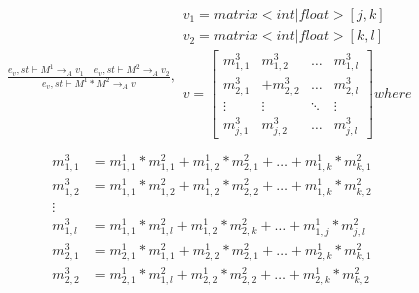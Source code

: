 \begin{minipage}{1.0\textwidth}
\begin{equation}
\begin{aligned}
	\frac { { e }_{ v },st\vdash { M }^{ 1 }{ \rightarrow  }_{ A }{ v }_{ 1 }\quad { e }_{ v },st\vdash { M }^{ 2 }{ \rightarrow  }_{ A }{ v }_{ 2 } }{ { e }_{ v },st\vdash { M }^{ 1 }*{ M }^{ 2 }{ \rightarrow  }_{ A }{ v } } ,\begin{matrix} { v }_{ 1 }=matrix<int|float>[j,k] \\ { v }_{ 2 }=matrix<int|float>[k,l] \\
	 v=\begin{bmatrix} { { m }_{ 1,1 }^{ 3 } } & { { m }_{ 1,2 }^{ 3 } } & \dots  & { m }_{ 1,l }^{ 3 }\\
{ { m }_{ 2,1 }^{ 3 } } &   +{ { m }_{ 2,2 }^{ 3 } } & \dots & { { m }_{ 2,l }^{ 3 } }
\\ \vdots  & \vdots & \ddots  & \vdots  \\
 { m }_{ j,1 }^{ 3 }& { { m }_{ j,2 }^{ 3 } } & \dots & { m }_{ j,l }^{ 3 } \end{bmatrix} where
\\ \end{matrix}
\end{aligned}
\end{equation}
\begin{equation*}
\begin{aligned}
{ { m }_{ 1,1 }^{ 3 } }  &= { { m }_{ 1,1 }^{ 1 } } *{ { m }_{ 1,1 }^{ 2 } }+ { { m }_{ 1,2 }^{ 1 } } *{ { m }_{ 2,1 }^{ 2 } }+\dots+ { { m }_{ 1,k }^{ 1 } } *{ { m }_{ k,1 }^{ 2 } }\\
{ { m }_{ 1,2 }^{ 3 } }  &= { { m }_{ 1,1 }^{ 1 } } *{ { m }_{ 1,2 }^{ 2 } }+ { { m }_{ 1,2 }^{ 1 } } *{ { m }_{ 2,2 }^{ 2 } }+\dots+ { { m }_{ 1,k }^{ 1 } } *{ { m }_{ k,2 }^{ 2 } }\\
\vdots\\
{ { m }_{ 1,l }^{ 3 } }  &= { { m }_{ 1,1 }^{ 1 } } *{ { m }_{ 1,l }^{ 2 } }+ { { m }_{ 1,2 }^{ 1 } } *{ { m }_{ 2,k }^{ 2 } }+\dots+ { { m }_{ 1,j }^{ 1 } } *{ { m }_{ j,l }^{ 2 } }\\
{ { m }_{ 2,1 }^{ 3 } }  &= { { m }_{ 2,1 }^{ 1 } } *{ { m }_{ 1,1 }^{ 2 } }+ { { m }_{ 2,2 }^{ 1 } } *{ { m }_{ 2,1 }^{ 2 } }+\dots+ { { m }_{ 2,k }^{ 1 } } *{ { m }_{ k,1 }^{ 2 } }\\
{ { m }_{ 2,2 }^{ 3 } }  &= { { m }_{ 2,1 }^{ 1 } } *{ { m }_{ 1,l }^{ 2 } }+ { { m }_{ 2,2 }^{ 1 } } *{ { m }_{ 2,2 }^{ 2 } }+\dots+ { { m }_{ 2,k }^{ 1 } } *{ { m }_{ k,2 }^{ 2 } }\\

\end{aligned}
\end{equation*}
\end{minipage}
